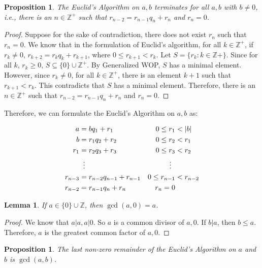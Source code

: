 \documentclass{article}
\newcommand{\Z}{\mathbb{Z}}
\newcommand{\SFTSOC}{Suppose for the sake of contradiction}
\newcommand{\st}{such that }
\newtheorem{lem}[thm]{Lemma}
\newtheorem{prop}[thm]{Proposition}
\begin{document}
\begin{prop}
\label{3.12}
The Euclid's Algorithm on $a, b$ terminates for all $a, b$ with $b\neq 0$, i.e., there is an $n \in \Z^+$ \st $r_{n-2} = r_{n-1}q_n+r_n$ and $r_n=0$.
\end{prop}

\begin{proof}
\SFTSOC, there does not exist $r_n$ \st $r_n=0$. We know that in the formulation of Euclid's algorithm, for all $k \in \Z^+$, if $r_k \neq 0$, $r_{k+2} = r_k q_k + r_{k+1}$, where $0 \leq r_{k+1} < r_{k}$. Let $S = \{r_k: k\in \Z+\}$. Since for all $k$, $r_k \geq 0$, $S \subseteq \{0\}\cup \Z^+$. By Generalized WOP, $S$ has a minimal element. However, since $r_k \neq 0$, for all $k\in\Z^+$, there is an element $k+1$ such that $r_{k+1} < r_k$. This contradicts that $S$ has a minimal element. Therefore, there is an $n \in \Z^+$ \st $r_{n-2} = r_{n-1}q_n+r_n$ and $r_n=0$.
\end{proof}

Therefore, we can formulate the Euclid's Algorithm on $a, b$ as:

\begin{align*}
a&=b q_1+r_1           &  0 \leq r_1 &< |b| \\
b&=r_1q_2+r_2          &  0 \leq r_2 &< r_1 \\
r_1&=r_2q_3+r_3        &  0 \leq r_3 &< r_2 \\
&\vdotswithin{=} & \vdotswithin{<} \\
r_{n-3}&=r_{n-2}q_{n-1}+r_{n-1}        &  0 \leq r_{n-1} &< r_{n-2}\\
r_{n-2}&=r_{n-1}q_n+r_n       &  r_n=0
\end{align*}

\begin{lem}
\label{3.13.2}
If $a \in \{0\} \cup \Z$, then $\gcd(a, 0)=a$.
\end{lem}

\begin{proof}
We know that $a|a, a|0$. So $a$ is a common divisor of $a, 0$. If $b|a$, then $b \leq a$. Therefore, $a$ is the greatest common factor of $a, 0$.
\end{proof}

\begin{prop}
\label{3.13}
The last non-zero remainder of the Euclid's Algorithm on $a$ and $b$ is $\gcd(a,b)$.
\end{prop}
\end{document}
